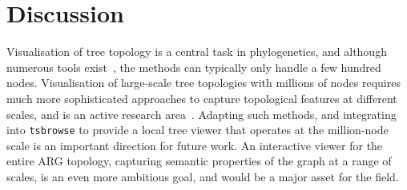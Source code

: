 \documentclass[unnumsec,webpdf,contemporary,large,namedate]{oup-authoring-template}%
\begin{document}

\section{Discussion} \label{sec:Discussion}
Visualisation of tree topology is a central task in phylogenetics,
and although numerous tools
exist~\citep[e.g.][]{huson2007dendroscope,vaughan2017icytree},
the methods can typically only handle a few hundred nodes.
Visualisation of large-scale tree topologies with millions of nodes
requires much more sophisticated approaches
to capture topological features at different scales,
and is an active research area~\citep{wong2022dynamic,kramer2023treenome}.
Adapting such methods, and integrating into \texttt{tsbrowse} to provide
a local tree viewer that operates at the million-node scale
is an important direction for future work.
An interactive viewer for the entire ARG topology, capturing
semantic properties of the graph at a range of scales, is an even more
ambitious goal, and would be a major asset for the field.

\end{document}
